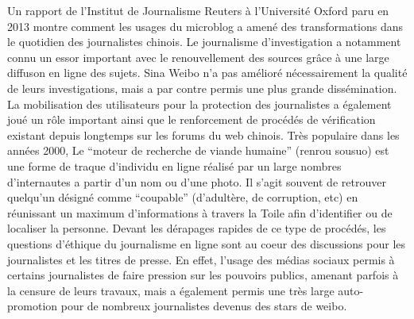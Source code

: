 {\color{black}
Un rapport de l'Institut de Journalisme Reuters \`a l'Universit\'e Oxford paru en 2013 montre comment les usages du
microblog a amen\'e des transformations dans le quotidien des journalistes chinois. Le journalisme d'investigation a
notamment connu un essor important avec le renouvellement des sources gr\^ace \`a une large diffuson en ligne des
sujets. Sina Weibo n'a pas am\'elior\'e n\'ecessairement la qualit\'e de leurs investigations, mais a par contre permis
une plus grande diss\'emination. La mobilisation des utilisateurs pour la protection des journalistes a \'egalement
jou\'e un r\^ole important ainsi que le renforcement de proc\'ed\'es de v\'erification existant depuis longtemps sur
les forums du web chinois. Tr\`es populaire dans les ann\'ees 2000, Le ``moteur de recherche de viande humaine''
(renrou sousuo) est une forme de traque d'individu en ligne r\'ealis\'e par un large nombres d'internautes a partir
d'un nom ou d'une photo. Il s'agit souvent de retrouver quelqu'un d\'esign\'e comme ``coupable'' (d'adult\`ere, de
corruption, etc) en r\'eunissant un maximum d'informations \`a travers la Toile afin d'identifier ou de localiser la
personne. Devant les d\'erapages rapides de ce type de proc\'ed\'es, les questions d'\'ethique du journalisme en ligne
sont au coeur des discussions pour les journalistes et les titres de presse. En effet, l'usage des m\'edias sociaux
permis \`a certains journalistes de faire pression sur les pouvoirs publics, amenant parfois \`a la censure de leurs
travaux, mais a \'egalement permis une tr\`es large auto-promotion pour de nombreux journalistes devenus des stars de
weibo.}


\bigskip

